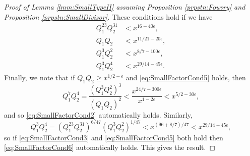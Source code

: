 \documentclass[10pt]{amsart}
\theoremstyle{plain}
\numberwithin{equation}{section}
\begin{document}
\begin{proof}[Proof of Lemma \ref{lmm:SmallTypeII} assuming Proposition \ref{prpstn:Fouvry} and Proposition \ref{prpstn:SmallDivisor}]
These conditions hold if we have
\begin{align}
Q_1^{23}Q_2^{31}&<x^{16-40\epsilon}\label{eq:SmallFactorCond3},\\
Q_1Q_2&<x^{11/21-20\epsilon}\label{eq:SmallFactorCond4},\\
Q_1^3Q_2^2&<x^{8/7-100\epsilon},\label{eq:SmallFactorCond5}\\
Q_1^3Q_2^4&<x^{29/14-45\epsilon}.\label{eq:SmallFactorCond6}
\end{align}
Finally, we note that if $Q_1Q_2\ge x^{1/2-\epsilon}$ and \eqref{eq:SmallFactorCond5} holds, then
\[
Q_1^7Q_2^4=\frac{(Q_1^3Q_2^2)^3}{(Q_1Q_2)^2}<\frac{x^{24/7-300\epsilon}}{x^{1-2\epsilon}}<x^{5/2-30\epsilon},
\]
and so  \eqref{eq:SmallFactorCond2} automatically holds. Similarly,
\[
Q_1^3Q_2^4=(Q_1^{23}Q_2^{31})^{6/47}(Q_1^3Q_2^2)^{1/47}<x^{(96+8/7)/47}<x^{29/14-45\epsilon},
\]
so if \eqref{eq:SmallFactorCond3} and \eqref{eq:SmallFactorCond5} both hold then \eqref{eq:SmallFactorCond6} automatically holds. This gives the result.
\end{proof}
%
%
%
%
%
%
%
%
\end{document}
